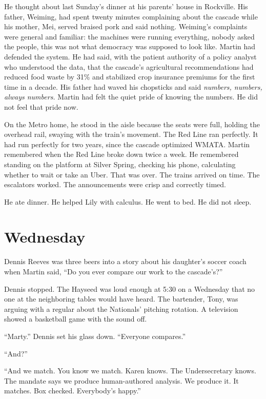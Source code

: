 \documentclass[11pt]{article}
\begin{document}
He thought about last Sunday's dinner at his parents' house in Rockville. His father, Weiming, had spent twenty minutes complaining about the cascade while his mother, Mei, served braised pork and said nothing. Weiming's complaints were general and familiar: the machines were running everything, nobody asked the people, this was not what democracy was supposed to look like. Martin had defended the system. He had said, with the patient authority of a policy analyst who understood the data, that the cascade's agricultural recommendations had reduced food waste by 31\% and stabilized crop insurance premiums for the first time in a decade. His father had waved his chopsticks and said \emph{numbers, numbers, always numbers.} Martin had felt the quiet pride of knowing the numbers. He did not feel that pride now.

On the Metro home, he stood in the aisle because the seats were full, holding the overhead rail, swaying with the train's movement. The Red Line ran perfectly. It had run perfectly for two years, since the cascade optimized WMATA. Martin remembered when the Red Line broke down twice a week. He remembered standing on the platform at Silver Spring, checking his phone, calculating whether to wait or take an Uber. That was over. The trains arrived on time. The escalators worked. The announcements were crisp and correctly timed.

He ate dinner. He helped Lily with calculus. He went to bed. He did not sleep.

\section*{Wednesday}

Dennis Reeves was three beers into a story about his daughter's soccer coach when Martin said, ``Do you ever compare our work to the cascade's?''

Dennis stopped. The Hayseed was loud enough at 5:30 on a Wednesday that no one at the neighboring tables would have heard. The bartender, Tony, was arguing with a regular about the Nationals' pitching rotation. A television showed a basketball game with the sound off.

``Marty.'' Dennis set his glass down. ``Everyone compares.''

``And?''

``And we match. You know we match. Karen knows. The Undersecretary knows. The mandate says we produce human-authored analysis. We produce it. It matches. Box checked. Everybody's happy.''
\end{document}
